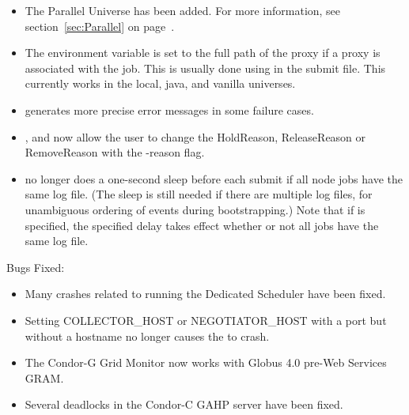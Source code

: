 \begin{itemize}

\item The Parallel Universe has been added.
  For more information, see section~\ref{sec:Parallel} on
  page~\pageref{sec:Parallel}.


\item 
{}
The environment variable  is set to the
full path of the proxy if a proxy is associated with the job.
This is usually done using  in the submit file.
This currently works in the local, java, and vanilla universes.

\item {} generates more precise error messages in 
some failure cases.

\item {},  and  now allow the user
to change the HoldReason, ReleaseReason or RemoveReason with the -reason
flag.

\item {} no longer does a one-second sleep before each
submit if all node jobs have the same log file.  (The sleep is still
needed if there are multiple log files, for unambiguous ordering of
events during bootstrapping.)  Note that if 
is specified, the specified delay takes effect whether or not all
jobs have the same log file.

\end{itemize}

\noindent Bugs Fixed:

\begin{itemize}

\item Many crashes related to running the Dedicated Scheduler have
been fixed.

\item Setting COLLECTOR\_HOST or NEGOTIATOR\_HOST with a port but without
a hostname no longer causes the  to crash.

\item The Condor-G Grid Monitor now works with Globus 4.0 pre-Web Services
GRAM.

\item Several deadlocks in the Condor-C GAHP server have been fixed.

\end{itemize}

